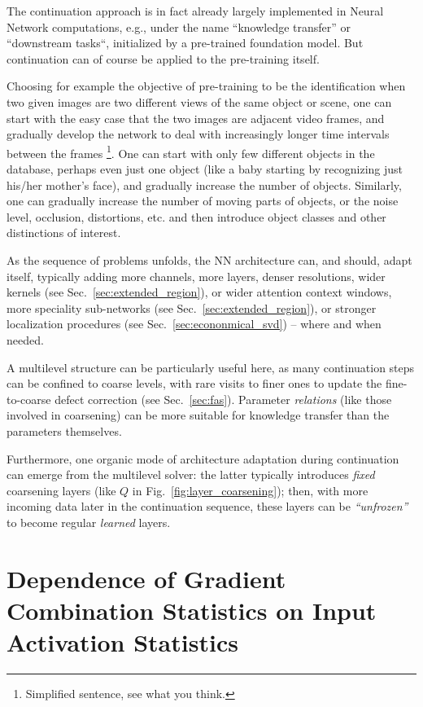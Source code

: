 \documentclass{article} %
\begin{document}
The continuation approach is in fact already largely implemented in Neural Network computations, e.g., under the name ``knowledge transfer'' or ``downstream tasks``, initialized by a pre-trained foundation model. But continuation can of course be applied to the pre-training itself.

Choosing for example the objective of pre-training to be the identification when two given images are two different views of the same object or scene, one can start with the easy case that the two images are adjacent video frames, and gradually develop the network to deal with increasingly longer time intervals between the frames \footnote{Simplified sentence, see what you think.}. One can start with only few different objects in the database, perhaps even just one object (like a baby starting by recognizing just his/her mother's face), and gradually increase the number of objects. Similarly, one can gradually increase the number of moving parts of objects, or the noise level, occlusion, distortions, etc. and then introduce object classes and other distinctions of interest.

As the sequence of problems unfolds, the NN architecture can, and should, adapt itself, typically adding more channels, more layers, denser resolutions, wider kernels (see Sec.~\ref{sec:extended_region}), or wider attention context windows, more speciality sub-networks (see Sec.~\ref{sec:extended_region}), or stronger localization procedures (see Sec.~\ref{sec:econonmical_svd}) -- where and when needed.

A multilevel structure can be particularly useful here, as many continuation steps can be confined to coarse levels, with rare visits to finer ones to update the fine-to-coarse defect correction (see Sec.~\ref{sec:fas}). Parameter {\it relations} (like those involved in coarsening) can be more suitable for knowledge transfer than the parameters themselves.

Furthermore, one organic mode of architecture adaptation during continuation can emerge from the multilevel solver: the latter typically introduces {\it fixed} coarsening layers (like $Q$ in Fig.~\ref{fig:layer_coarsening}); then, with more incoming data later in the continuation sequence, these layers can be {\it ``unfrozen''} to become regular {\it learned} layers.

\newpage
\section{Dependence of Gradient Combination Statistics on Input Activation Statistics}
\label{sec:x}
\end{document}
